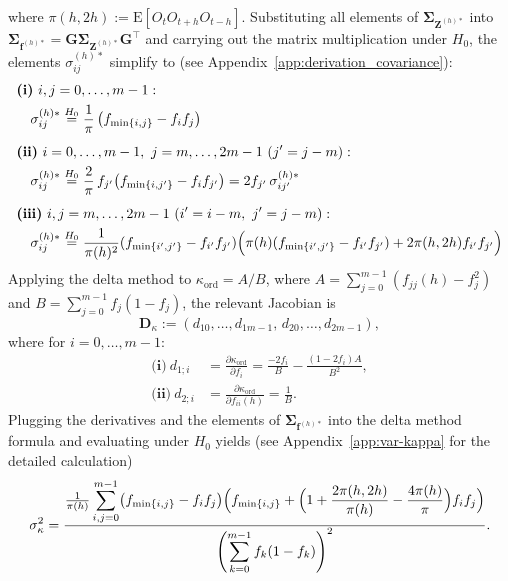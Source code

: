 ﻿\documentclass[12pt,a4paper]{scrreprt}
\theoremstyle{definition}
\begin{document}
where $\pi(h,2h) := \mathrm{E}[O_t O_{t+h}O_{t-h}]$.
Substituting all elements of $\boldsymbol{\Sigma}_{\boldsymbol{Z}^{(h)*}}$ 
into $\boldsymbol{\Sigma}_{\boldsymbol{f}^{(h)*}} = \boldsymbol{G}
\boldsymbol{\Sigma}_{\boldsymbol{Z}^{(h)*}}\boldsymbol{G}^\top$ and 
carrying out the matrix multiplication under $H_0$, the elements 
$\sigma^{(h)*}_{ij}$ simplify to (see Appendix~\ref{app:derivation_covariance}):
{\allowdisplaybreaks\begin{align*}
    &\textbf{(i)}\ i,j = 0,\ldots,m-1: \\
    &\quad \sigma^{(h)*}_{ij} \overset{H_0}{=} 
        \frac{1}{\pi}\left(f_{\min\{i,j\}} - f_if_j\right) \\[1ex]
    &\textbf{(ii)}\ i = 0,\ldots,m-1,\ j = m,\ldots,2m-1\ (j'=j-m):\\
    &\quad \sigma^{(h)*}_{ij} \overset{H_0}{=} 
        \frac{2}{\pi}\,f_{j'}\!\left(f_{\min\{i,j'\}} - f_if_{j'}\right)
        = 2f_{j'}\,\sigma^{(h)*}_{ij'} \\[1ex]
    &\textbf{(iii)}\ i,j = m,\ldots,2m-1\ (i'=i-m,\ j'=j-m):\\
    &\quad \sigma^{(h)*}_{ij} \overset{H_0}{=} 
        \frac{1}{\pi(h)^2}(f_{\min\{i',j'\}}-f_{i'}f_{j'})
        \Bigl(\pi(h)(f_{\min\{i',j'\}}-f_{i'}f_{j'}) 
        + 2\pi(h,2h)f_{i'}f_{j'}\Bigr)
\end{align*}}\noindent
Applying the delta method to 
$\kappa_{\mathrm{ord}} = A/B$, where 
$A = \sum_{j=0}^{m-1}(f_{jj}(h)-f_j^2)$ and 
$B = \sum_{j=0}^{m-1}f_j(1-f_j)$, the relevant Jacobian is
\[
    \boldsymbol{D}_{\kappa} := 
    \left(d_{10},\ldots,d_{1m-1},\,d_{20},\ldots,d_{2m-1}\right),
\]
where for $i = 0,\ldots,m-1$:
\begin{align*}
    \textbf{(i)}\ d_{1;i} 
    &= \frac{\partial\kappa_{\mathrm{ord}}}{\partial f_i}
    = \frac{-2f_i}{B} - \frac{(1-2f_i)A}{B^2}, \\
    \textbf{(ii)}\ d_{2;i} 
    &= \frac{\partial\kappa_{\mathrm{ord}}}{\partial f_{ii}(h)}
    = \frac{1}{B}.
\end{align*}
Plugging the derivatives and the elements of 
$\boldsymbol{\Sigma}_{\boldsymbol{f}^{(h)*}}$ into the delta method 
formula and evaluating under $H_0$ yields (see Appendix~\ref{app:var-kappa} 
for the detailed calculation)
\begin{align*}
    \sigma^2_\kappa 
    = \frac{\frac{1}{\pi(h)}\displaystyle\sum_{i,j=0}^{m-1} 
      \bigl(f_{\min\{i,j\}}-f_if_j\bigr)
      \Bigl(f_{\min\{i,j\}} 
      + \Bigl(1 + \dfrac{2\pi(h,2h)}{\pi(h)} 
      - \dfrac{4\pi(h)}{\pi}\Bigr)f_if_j\Bigr)}
     {\left(\displaystyle\sum_{k=0}^{m-1}f_k(1-f_k)\right)^2}.
\end{align*}
\end{document}
